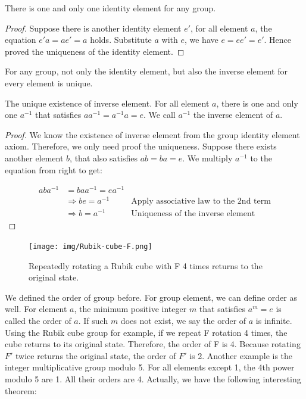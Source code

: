 \documentclass[b5paper]{article}
\begin{document}
\begin{theorem}
There is one and only one identity element for any group.
\end{theorem}

\begin{proof}
Suppose there is another identity element $e'$, for all element $a$, the equation $e'a = ae' = a$ holds. Substitute $a$ with $e$, we have $e = ee'= e'$. Hence proved the uniqueness of the identity element.
\end{proof}

For any group, not only the identity element, but also the inverse element for every element is unique.

\begin{theorem}
The unique existence of inverse element. For all element $a$, there is one and only one $a^{-1}$ that satisfies $aa^{-1} = a^{-1}a = e$. We call $a^{-1}$ the inverse element of $a$.
\end{theorem}

\begin{proof}
We know the existence of inverse element from the group identity element axiom. Therefore, we only need proof the uniqueness. Suppose there exists another element $b$, that also satisfies $ab = ba = e$. We multiply $a^{-1}$ to the equation from right to get:

\[
\begin{array}{rll}
aba^{-1} & = baa^{-1} = ea^{-1} & \\
& \Rightarrow be = a^{-1} & \text{Apply associative law to the 2nd term} \\
& \Rightarrow b = a^{-1} & \text{Uniqueness of the inverse element}
\end{array}
\]
\end{proof}

\begin{figure}[htbp]
 \centering
 \texttt{[image: img/Rubik-cube-F.png]}
 \caption{Repeatedly rotating a Rubik cube with F 4 times returns to the original state.}
 \label{fig:Rubik-cube-F}
\end{figure}

We defined the order of group before. For group element, we can define order as well. For element $a$, the minimum positive integer $m$ that satisfies $a^m = e$ is called the order of $a$. If such $m$ does not exist, we say the order of $a$ is infinite. Using the Rubik cube group for example, if we repeat F rotation 4 times, the cube returns to its original state. Therefore, the order of F is 4. Because rotating $F'$ twice returns the original state, the order of $F'$ is 2. Another example is the integer multiplicative group modulo 5. For all elements except 1, the 4th power modulo 5 are 1. All their orders are 4. Actually, we have the following interesting theorem:
\end{document}
